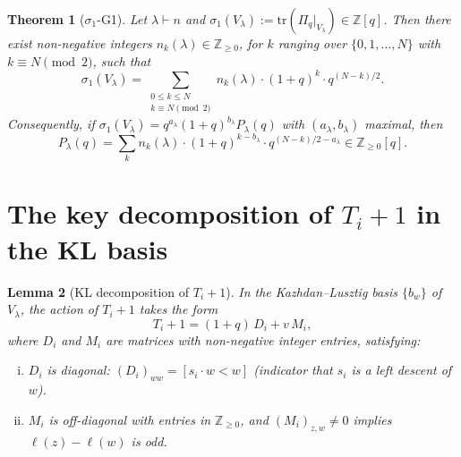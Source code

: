 \documentclass[11pt]{article}
\theoremstyle{plain}
\newtheorem{theorem}{Theorem}
\newtheorem{lemma}[theorem]{Lemma}
\theoremstyle{definition}
\theoremstyle{remark}
\newcommand{\Z}{\mathbb{Z}}
\newcommand{\Pibs}{\Pi_q}
\newcommand{\Vlam}{V_\lambda}
\newcommand{\trace}{\mathrm{tr}}
\begin{document}
\begin{theorem}[$\sigma_1$-G1]
\label{thm:main}
Let $\lambda \vdash n$ and $\sigma_1(\Vlam) := \trace(\Pibs|_{\Vlam}) \in \Z[q]$. Then there exist non-negative integers $n_k(\lambda) \in \Z_{\geq 0}$, for $k$ ranging over $\{0, 1, \ldots, N\}$ with $k \equiv N \pmod 2$, such that
\begin{equation}
\sigma_1(\Vlam) = \sum_{\substack{0 \leq k \leq N \\ k \equiv N \!\!\!\!\pmod 2}} n_k(\lambda) \cdot (1+q)^k \cdot q^{(N-k)/2}. \label{eq:main}
\end{equation}
Consequently, if $\sigma_1(\Vlam) = q^{a_\lambda}(1+q)^{b_\lambda} P_\lambda(q)$ with $(a_\lambda, b_\lambda)$ maximal, then
\[ P_\lambda(q) = \sum_k n_k(\lambda) \cdot (1+q)^{k - b_\lambda} \cdot q^{(N-k)/2 - a_\lambda} \in \Z_{\geq 0}[q]. \]
\end{theorem}

\section{The key decomposition of $T_i + 1$ in the KL basis}

\begin{lemma}[KL decomposition of $T_i + 1$]
\label{lem:decomp}
In the Kazhdan--Lusztig basis $\{b_w\}$ of $\Vlam$, the action of $T_i + 1$ takes the form
\[ T_i + 1 = (1+q)\, D_i + v\, M_i, \]
where $D_i$ and $M_i$ are matrices with non-negative integer entries, satisfying:
\begin{enumerate}[(i)]
    \item $D_i$ is diagonal: $(D_i)_{ww} = [s_i \cdot w < w]$ (indicator that $s_i$ is a left descent of $w$).
    \item $M_i$ is off-diagonal with entries in $\Z_{\geq 0}$, and $(M_i)_{z,w} \neq 0$ implies $\ell(z) - \ell(w)$ is \emph{odd}.
\end{enumerate}
\end{lemma}
\end{document}
